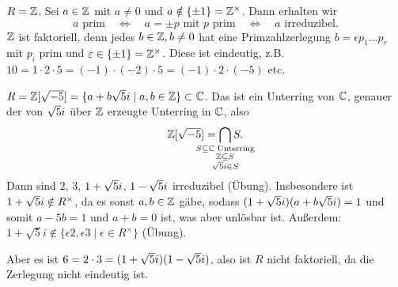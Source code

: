 \documentclass[12pt,a4paper]{scrartcl}
\begin{document}
\begin{bsp}
	$R = \mathbb Z$. Sei $a\in\mathbb Z$ mit $a\neq 0$ und $a\notin\{\pm1\} = \mathbb Z^{\times}$. Dann erhalten wir \[\text{$a$ prim} \quad \Longleftrightarrow \quad \text{$a=\pm p$ mit $p$ prim} \quad\Longleftrightarrow\quad \text{$a$ irreduzibel}.\] $\mathbb Z$ ist faktoriell, denn jedes $b\in\mathbb Z, b\neq 0$ hat eine Primzahlzerlegung $b = \epsilon p_1\dots p_r$ mit $p_i$ prim und $\varepsilon \in\{\pm 1\} = \mathbb Z^{\times}$. Diese ist \glqq eindeutig\grqq, z.B. $10 = 1\cdot 2\cdot 5 = (-1)\cdot(-2)\cdot 5 = (-1)\cdot2\cdot(-5)$ etc. 
\end{bsp}
\begin{bsp}
	$R = \mathbb Z[\sqrt{-5}] = \{a+b\sqrt{5}i\mid a,b\in \mathbb Z\}\subset \mathbb C$. Das ist ein Unterring von $\mathbb C$, genauer der von $\sqrt{5}i$ über $\mathbb Z$ erzeugte Unterring in $\mathbb C$, also \[\IZ[\sqrt{-5}] = \bigcap_{\mathclap{\substack{S \subseteq \IC \text{ Unterring}\\\IZ \subseteq S \\ \sqrt{5} \ima \in S }}}S. \]
	Dann sind $2$, $3$, $1+\sqrt{5}i$, $1-\sqrt{5}i$ irreduzibel (Übung). Insbesondere ist $1+\sqrt{5}i\notin R^{\times}$, da es sonst $a,b \in \mathbb Z$ gäbe, sodass $(1+\sqrt 5 i)(a+b\sqrt 5i)=1$ und somit $a-5b=1$ und $a+b=0$ ist, was aber unlösbar ist.
	Außerdem: $1+\sqrt{5}i\notin \{\epsilon 2,\epsilon3 \mid\epsilon\in R^{\times}\}$ (Übung).
	
	Aber es ist $ 6 = 2\cdot 3 = (1+\sqrt{5}i)(1-\sqrt{5}i)$, also ist $R$ nicht faktoriell, da die Zerlegung nicht eindeutig ist.
\end{bsp}
\end{document}
